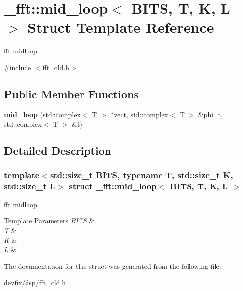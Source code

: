 \hypertarget{struct__fft_1_1mid__loop}{}\section{\+\_\+fft\+:\+:mid\+\_\+loop$<$ B\+I\+TS, T, K, L $>$ Struct Template Reference}
\label{struct__fft_1_1mid__loop}


fft midloop  




{\ttfamily \#include $<$fft\+\_\+old.\+h$>$}

\subsection*{Public Member Functions}
\begin{DoxyCompactItemize}
\item 
\mbox{\label{struct__fft_1_1mid__loop_ac959fe04f9bd2a9bbeaf7889c03780b6}} 
{\bfseries mid\+\_\+loop} (std\+::complex$<$ T $>$ $\ast$vect, std\+::complex$<$ T $>$ \&phi\+\_\+t, std\+::complex$<$ T $>$ \&t)
\end{DoxyCompactItemize}


\subsection{Detailed Description}
\subsubsection*{template$<$std\+::size\+\_\+t B\+I\+TS, typename T, std\+::size\+\_\+t K, std\+::size\+\_\+t L$>$\newline
struct \+\_\+fft\+::mid\+\_\+loop$<$ B\+I\+T\+S, T, K, L $>$}

fft midloop 


\begin{DoxyTemplParams}{Template Parameters}
{\em B\+I\+TS} & \\
\hline
{\em T} & \\
\hline
{\em K} & \\
\hline
{\em L} & \\
\hline
\end{DoxyTemplParams}


The documentation for this struct was generated from the following file\+:\begin{DoxyCompactItemize}
\item 
devfix/dsp/fft\+\_\+old.\+h\end{DoxyCompactItemize}
